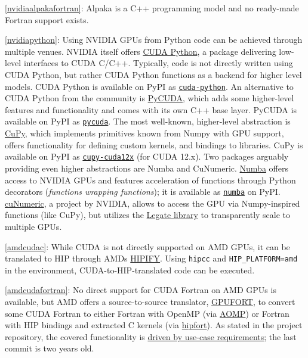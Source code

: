 \item \ref{nvidiaalpakafortran}: Alpaka is a C++ programming model and no ready-made Fortran support exists.
\item \ref{nvidiapython}: Using NVIDIA GPUs from Python code can be achieved through multiple venues. NVIDIA itself offers \href{https://github.com/NVIDIA/cuda-python}{CUDA Python}, a package delivering low-level interfaces to CUDA C/C++. Typically, code is not directly written using CUDA Python, but rather CUDA Python functions as a backend for higher level models. CUDA Python is available on PyPI as \href{https://pypi.org/project/cuda-python/}{\texttt{cuda-python}}. An alternative to CUDA Python from the community is \href{https://github.com/inducer/pycuda}{PyCUDA}, which adds some higher-level features and functionality and comes with its own C++ base layer. PyCUDA is available on PyPI as \href{https://pypi.org/project/pycuda/}{\texttt{pycuda}}. The most well-known, higher-level abstraction is \href{https://cupy.dev/}{CuPy}, which implements primitives known from Numpy with GPU support, offers functionality for defining custom kernels, and bindings to libraries. CuPy is available on PyPI as \href{https://pypi.org/project/cupy-cuda12x/}{\texttt{cupy-cuda12x}} (for CUDA 12.x). Two packages arguably providing even higher abstractions are Numba and CuNumeric. \href{http://numba.pydata.org/}{Numba} offers access to NVIDIA GPUs and features acceleration of functions through Python decorators (\emph{functions wrapping functions}); it is available as \href{https://pypi.org/project/numba/}{\texttt{numba}} on PyPI. \href{https://github.com/nv-legate/cunumeric}{cuNumeric}, a project by NVIDIA, allows to access the GPU via Numpy-inspired functions (like CuPy), but utilizes the \href{https://github.com/nv-legate/legate.core}{Legate library} to transparently scale to multiple GPUs.
\item \ref{amdcudac}: While CUDA is not directly supported on AMD GPUs, it can be translated to HIP through AMD\textquotesingle s \href{https://github.com/ROCm-Developer-Tools/HIPIFY}{HIPIFY}. Using \texttt{hipcc} and \texttt{HIP\_PLATFORM=amd} in the environment, CUDA-to-HIP-translated code can be executed.
\item \ref{amdcudafortran}: No direct support for CUDA Fortran on AMD GPUs is available, but AMD offers a source-to-source translator, \href{https://github.com/ROCmSoftwarePlatform/gpufort}{GPUFORT}, to convert some CUDA Fortran to either Fortran with OpenMP (via \href{https://github.com/ROCm-Developer-Tools/aomp}{AOMP}) or Fortran with HIP bindings and extracted C kernels (via \href{https://github.com/ROCmSoftwarePlatform/hipfort}{hipfort}). As stated in the project repository, the covered functionality is \href{https://github.com/ROCmSoftwarePlatform/gpufort\#limitations}{driven by use-case requirements}; the last commit is two years old.
